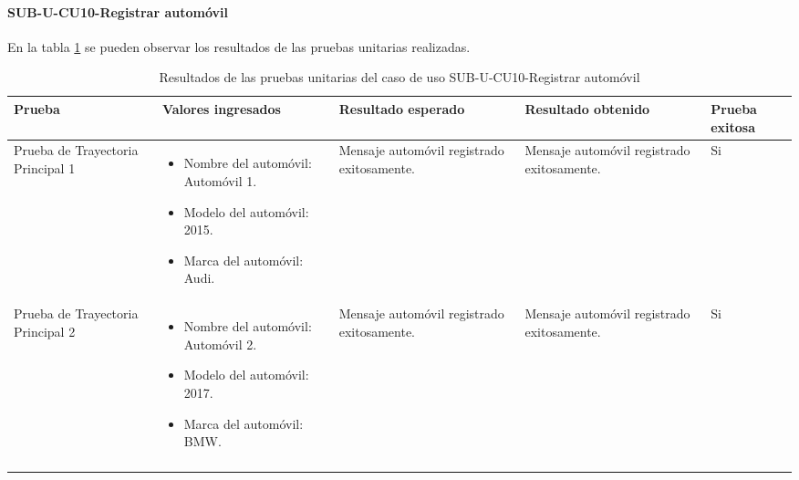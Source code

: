 \paragraph{SUB-U-CU10-Registrar automóvil}\label{SUB-U-CU10:Pruebas}
En la tabla \ref{pruebas_unitarias_sub-u-cu10} se pueden observar los resultados de las pruebas unitarias realizadas.
\begin{longtable}{|M{2cm}| M{4.5cm}|M{3cm}|M{3cm}|M{1.5cm}|}
	\hline
	\textbf{Prueba} & \textbf{Valores ingresados} & \textbf{Resultado esperado} & \textbf{Resultado obtenido} & \textbf{Prueba exitosa} \\ \hline
	Prueba de Trayectoria Principal 1 & 
	\begin{itemize}
		\item Nombre del automóvil: Automóvil 1.
		\item Modelo del automóvil: 2015.
		\item Marca del automóvil: Audi.
	\end{itemize}
	& 
	Mensaje automóvil registrado exitosamente.
	&
	Mensaje automóvil registrado exitosamente.
	& Si \\ \hline

	Prueba de Trayectoria Principal 2 & 
	\begin{itemize}
		\item Nombre del automóvil: Automóvil 2.
		\item Modelo del automóvil: 2017.
		\item Marca del automóvil: BMW.
	\end{itemize}
	& 
	Mensaje automóvil registrado exitosamente.
	&
	Mensaje automóvil registrado exitosamente.
	& Si \\ \hline

	\caption{Resultados de las pruebas unitarias del caso de uso SUB-U-CU10-Registrar automóvil}
	\label{pruebas_unitarias_sub-u-cu10}
\end{longtable}

